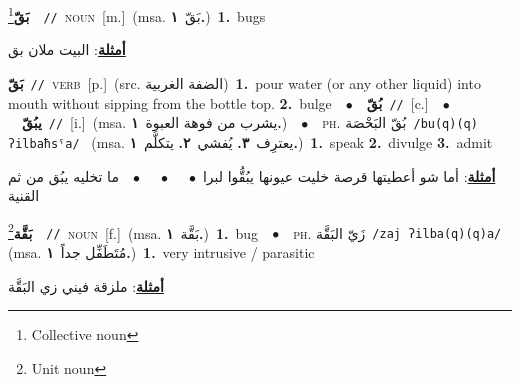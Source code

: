 \documentclass[10pt,a4paper,twoside]{article} %
\begin{document}
\begin{multicols}{2}
{\setlength\topsep{0pt}\textbf{\foreignlanguage{arabic}{بَقّ}}\footnote{Collective noun}\ \ {\color{gray}\texttt{//}\color{black}}\ \textsc{noun}\ [m.]\ \color{gray}(msa. \foreignlanguage{arabic}{بَقّ}~\foreignlanguage{arabic}{\textbf{١.}})\color{black}\ \textbf{1.}~bugs\  \begin{flushright}\color{gray}\foreignlanguage{arabic}{\textbf{\underline{\foreignlanguage{arabic}{أمثلة}}}: البيت ملان بق}\end{flushright}\color{black}} \vspace{2mm}

{\setlength\topsep{0pt}\textbf{\foreignlanguage{arabic}{بَقّ}}\ {\color{gray}\texttt{//}\color{black}}\ \textsc{verb}\ [p.]\ (src. \color{gray}\foreignlanguage{arabic}{الضفة الغربية}\color{black})\ \textbf{1.}~pour water (or any other liquid) into mouth without sipping from the bottle top.  \textbf{2.}~bulge\ \ $\bullet$\ \ \setlength\topsep{0pt}\textbf{\foreignlanguage{arabic}{بُقّ}}\ {\color{gray}\texttt{//}\color{black}}\ [c.]\ \ $\bullet$\ \ \setlength\topsep{0pt}\textbf{\foreignlanguage{arabic}{يبُقّ}}\ {\color{gray}\texttt{//}\color{black}}\ [i.]\ \color{gray}(msa. \foreignlanguage{arabic}{يشرب من فوهة العبوة}~\foreignlanguage{arabic}{\textbf{١.}})\color{black}\ \ $\bullet$\ \ \textsc{ph.} \color{gray} \foreignlanguage{arabic}{بُقّ البَحْصَة}\color{black}\ {\color{gray}\texttt{/{\sffamily bu(q)(q) ʔilbaħsˤa}/}\color{black}}\ \color{gray} (msa. \foreignlanguage{arabic}{يعترِف}~\foreignlanguage{arabic}{\textbf{٣.}}  \foreignlanguage{arabic}{يُفشي}~\foreignlanguage{arabic}{\textbf{٢.}}  \foreignlanguage{arabic}{يتكلَّم}~\foreignlanguage{arabic}{\textbf{١.}})\color{black}\ \textbf{1.}~speak  \textbf{2.}~divulge  \textbf{3.}~admit\  \begin{flushright}\color{gray}\foreignlanguage{arabic}{\textbf{\underline{\foreignlanguage{arabic}{أمثلة}}}: أما شو أعطيتها قرصة خليت عيونها يبُقُّوا لبرا\ $\bullet$\ \  \ $\bullet$\ \  \ $\bullet$\ \  ما تخليه يبُق من ثم القنية}\end{flushright}\color{black}} \vspace{2mm}

{\setlength\topsep{0pt}\textbf{\foreignlanguage{arabic}{بَقَّة}}\footnote{Unit noun}\ \ {\color{gray}\texttt{//}\color{black}}\ \textsc{noun}\ [f.]\ \color{gray}(msa. \foreignlanguage{arabic}{بَقَّة}~\foreignlanguage{arabic}{\textbf{١.}})\color{black}\ \textbf{1.}~bug\ \ $\bullet$\ \ \textsc{ph.} \color{gray} \foreignlanguage{arabic}{زَيّ البَقَّة}\color{black}\ {\color{gray}\texttt{/{\sffamily zaj ʔilba(q)(q)a}/}\color{black}}\ \color{gray} (msa. \foreignlanguage{arabic}{مُتَطَفِّل جداً}~\foreignlanguage{arabic}{\textbf{١.}})\color{black}\ \textbf{1.}~very intrusive / parasitic\  \begin{flushright}\color{gray}\foreignlanguage{arabic}{\textbf{\underline{\foreignlanguage{arabic}{أمثلة}}}: ملزقة فيني زي البَقَّة}\end{flushright}\color{black}} \vspace{2mm}


\end{multicols}
\end{document}
